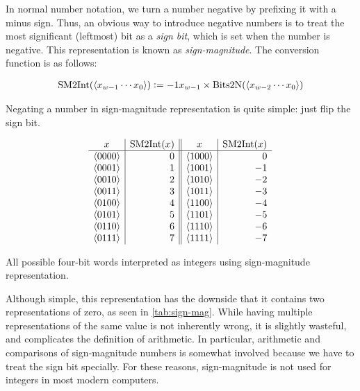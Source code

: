 In normal number notation, we turn a number negative by prefixing it
with a minus sign.  Thus, an obvious way to introduce negative numbers
is to treat the most significant (leftmost) bit as a \emph{sign bit},
which is set when the number is negative.  This representation is
known as \emph{sign-magnitude}.  The conversion function is as
follows:

\begin{definition}
\begin{align*}
  \mathrm{SM2Int}(\langle x_{w-1}\cdots x_{0} \rangle) \vcentcolon= -1x_{w-1} \times \mathrm{Bits2N}(\langle x_{w-2}\cdots x_{0} \rangle)
\end{align*}
\label{def:sm2int}
\end{definition}

Negating a number in sign-magnitude representation is quite simple:
just flip the sign bit.

\begin{table}
  \centering
  \[
  \begin{array}{c|r||c|r}
    x & \mathrm{SM2Int}(x) & x & \mathrm{SM2Int}(x) \\\hline
    \langle 0000 \rangle & 0 & \langle 1000 \rangle & 0 \\
    \langle 0001 \rangle & 1 & \langle 1001 \rangle & -1 \\
    \langle 0010 \rangle & 2 & \langle 1010 \rangle & -2 \\
    \langle 0011 \rangle & 3 & \langle 1011 \rangle & -3 \\
    \langle 0100 \rangle & 4 & \langle 1100 \rangle & -4 \\
    \langle 0101 \rangle & 5 & \langle 1101 \rangle & -5 \\
    \langle 0110 \rangle & 6 & \langle 1110 \rangle & -6 \\
    \langle 0111 \rangle & 7 & \langle 1111 \rangle & -7 \\
  \end{array}
  \]
  \caption{All possible four-bit words interpreted as integers using
    sign-magnitude representation.}
  \label{tab:sign-mag}
\end{table}

Although simple, this representation has the downside that it contains
two representations of zero, as seen in \cref{tab:sign-mag}.  While
having multiple representations of the same value is not inherently
wrong, it is slightly wasteful, and complicates the definition of
arithmetic.  In particular, arithmetic and comparisons of
sign-magnitude numbers is somewhat involved because we have to treat
the sign bit specially.  For these reasons, sign-magnitude is not used
for integers in most modern computers.

